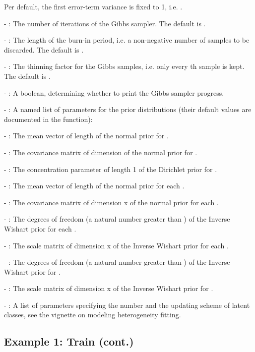 \documentclass[article]{jss}
\newcommand{\fct}[1]{\code{#1()}}
\begin{document}
  Per default, the first error-term variance is fixed to 1, i.e. .

- : The number of iterations of the Gibbs sampler. The default is .

- : The length of the burn-in period, i.e. a non-negative number of samples to be discarded. The default is .

- : The thinning factor for the Gibbs samples, i.e. only every th sample is kept. The default is .

- : A boolean, determining whether to print the Gibbs sampler progress.

- : A named list of parameters for the prior distributions (their default values are documented in the \fct{check\_prior} function):

  - : The mean vector of length  of the normal prior for .

  - : The covariance matrix of dimension  of the normal prior for .

  - : The concentration parameter of length 1 of the Dirichlet prior for .

  - : The mean vector of length  of the normal prior for each .

  - : The covariance matrix of dimension  x  of the normal prior for each .

  - : The degrees of freedom (a natural number greater than ) of the Inverse Wishart prior for each .

  - : The scale matrix of dimension  x  of the Inverse Wishart prior for each .

  - : The degrees of freedom (a natural number greater than ) of the Inverse Wishart prior for .

  - : The scale matrix of dimension  x  of the Inverse Wishart prior for .

- : A list of parameters specifying the number and the updating scheme of latent classes, see the vignette on modeling heterogeneity fitting.

\subsection{Example 1: Train (cont.)} \label{subsec:train_cont}
\end{document}

